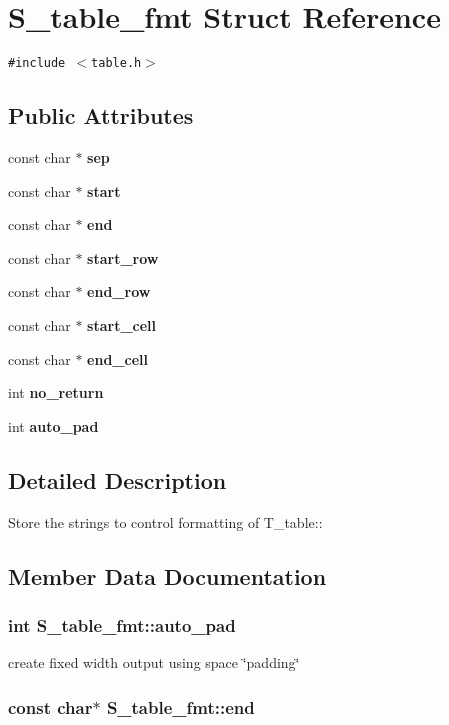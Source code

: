 \section{S\_\-table\_\-fmt Struct Reference}
\label{structS__table__fmt}
{\tt \#include $<$table.h$>$}

\subsection*{Public Attributes}
\begin{CompactItemize}
\item 
const char $\ast$ {\bf sep}
\item 
const char $\ast$ {\bf start}
\item 
const char $\ast$ {\bf end}
\item 
const char $\ast$ {\bf start\_\-row}
\item 
const char $\ast$ {\bf end\_\-row}
\item 
const char $\ast$ {\bf start\_\-cell}
\item 
const char $\ast$ {\bf end\_\-cell}
\item 
int {\bf no\_\-return}
\item 
int {\bf auto\_\-pad}
\end{CompactItemize}


\subsection{Detailed Description}
Store the strings to control formatting of T\_\-table:: 



\subsection{Member Data Documentation}
\subsubsection{\setlength{\rightskip}{0pt plus 5cm}int S\_\-table\_\-fmt::auto\_\-pad}\label{structS__table__fmt_m8}


create fixed width output  using space \char`\"{}padding\char`\"{} 
\subsubsection{\setlength{\rightskip}{0pt plus 5cm}const char$\ast$ S\_\-table\_\-fmt::end}\label{structS__table__fmt_m2}


